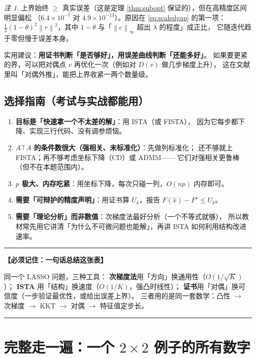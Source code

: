 \documentclass[11pt,a4paper,UTF8]{ctexart}
\theoremstyle{plain}
\theoremstyle{definition}
\theoremstyle{remark}
\newtheorem{remark}[theorem]{注}
\newcommand{\norm}[1]{\left\lVert #1 \right\rVert}
\newenvironment{keypoint}[1]
  {\par\medskip\noindent\begin{minipage}{\linewidth}%
   \hrule\smallskip\noindent\textbf{【必须记住：#1】}\par\nopagebreak\smallskip}
  {\smallskip\hrule\end{minipage}\medskip}
\begin{document}
\begin{remark}
上界始终 $\ge$ 真实误差（这是定理 \ref{thm:subopt} 保证的），但在高精度区间明显偏松
（$6.4\times10^{-7}$ 对 $4.9\times10^{-13}$）。原因在 \eqref{eq:scaledgap} 的第一项：
$\frac12(1-\theta)^2\norm{r}^2$，其中 $1-\theta$ 与「$\norm c_\infty$ 超出 $\lambda$ 的程度」成正比，
它随迭代趋于零但慢于误差本身。

实用建议：\textbf{用证书判断「是否够好」，用误差曲线判断「还能多好」}。
如果要更紧的界，可以把对偶点 $v$ 再优化一次（例如对 $D(v)$ 做几步梯度上升），
这在文献里叫「对偶外推」，能把上界收紧一两个数量级。
\end{remark}

\subsection{选择指南（考试与实战都能用）}

\begin{enumerate}
\item \textbf{目标是「快速拿一个不太差的解」}：用 ISTA（或 FISTA），
      因为它每步都下降、实现三行代码、没有调参烦恼。
\item \textbf{$A\top A$ 的条件数很大（强相关、未标准化）}：先做列标准化；
      还不够就上 FISTA；再不够考虑坐标下降（CD）或 ADMM——
      它们对强相关更鲁棒（但不在本题范围内）。
\item \textbf{$p$ 极大、内存吃紧}：用坐标下降，每次只碰一列，$O(np)$ 内存即可。
\item \textbf{需要「可辩护的精度声明」}：用证书算 $U_k$，报告 $F(\hat x)-F^\star\le U_k$。
\item \textbf{需要「理论分析」而非数值}：次梯度法最好分析（一个不等式就够），
      所以教材常先用它讲清「为什么不可微问题也能解」，再讲 ISTA 如何利用结构改进速率。
\end{enumerate}

\begin{keypoint}{一句话总结这张表}
同一个 LASSO 问题，三种工具：
\textbf{次梯度法}用「方向」换通用性（$O(1/\sqrt K)$）；
\textbf{ISTA} 用「结构」换速度（$O(1/K)$，强凸时线性）；
\textbf{证书}用「对偶」换可信度（一步验证最优性，或给出误差上界）。
三者用的是同一套数学：凸性 $\to$ 次梯度 $\to$ KKT $\to$ 对偶 $\to$ 特征值定步长。
\end{keypoint}

\section{完整走一遍：一个 $2\times2$ 例子的所有数字}
\end{document}

